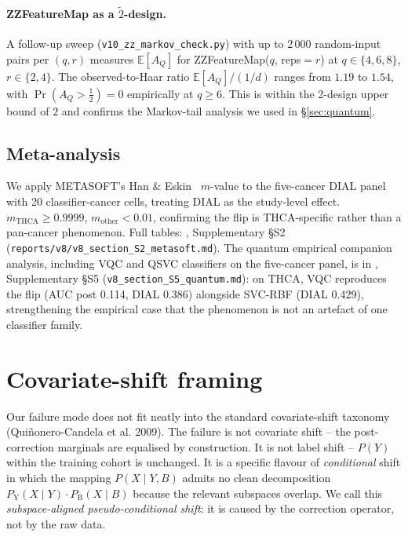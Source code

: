 \documentclass[letterpaper,11pt]{article}
\newcommand{\E}{\mathbb{E}}
\begin{document}
\paragraph{ZZFeatureMap as a $\tilde 2$-design.}
A follow-up sweep (\texttt{v10\_zz\_markov\_check.py}) with up to 2\,000
random-input pairs per $(q,r)$ measures $\E[A_Q]$ for
ZZFeatureMap($q$, reps$=r$) at $q\in\{4,6,8\}$, $r\in\{2,4\}$.  The
observed-to-Haar ratio $\E[A_Q]/(1/d)$ ranges from $1.19$ to $1.54$,
with $\Pr(A_Q>\tfrac12)=0$ empirically at $q\ge 6$. This is within
the 2-design upper bound of $2$ and confirms the Markov-tail analysis
we used in \S\ref{sec:quantum}.

\subsection{Meta-analysis}
We apply METASOFT's Han \& Eskin~\cite{han2011metasoft} $m$-value
to the five-cancer DIAL panel with 20 classifier-cancer cells,
treating DIAL as the study-level effect. $m_\text{THCA}\ge 0.9999$,
$m_\text{other}<0.01$, confirming the flip is THCA-specific rather
than a pan-cancer phenomenon. Full tables:
\cite{thcadash_bioinfo_2026}, Supplementary §S2
(\texttt{reports/v8/v8\_section\_S2\_metasoft.md}). The quantum
empirical companion analysis, including VQC and QSVC classifiers on
the five-cancer panel, is in \cite{thcadash_bioinfo_2026},
Supplementary §S5 (\texttt{v8\_section\_S5\_quantum.md}): on THCA,
VQC reproduces the flip (AUC post 0.114, DIAL 0.386) alongside
SVC-RBF (DIAL 0.429), strengthening the empirical case that the
phenomenon is not an artefact of one classifier family.

\section{Covariate-shift framing}
\label{sec:related-cov}

Our failure mode does not fit neatly into the standard covariate-shift
taxonomy (Qui\~nonero-Candela et al. 2009). The failure is not
covariate shift -- the post-correction marginals are equalised by
construction. It is not label shift -- $P(Y)$ within the training
cohort is unchanged. It is a specific flavour of \emph{conditional}
shift in which the mapping $P(X\mid Y,B)$ admits no clean
decomposition $P_{\mathrm{Y}}(X\mid Y)\cdot P_{\mathrm{B}}(X\mid B)$
because the relevant subspaces overlap. We call this
\emph{subspace-aligned pseudo-conditional shift}: it is caused by the
correction operator, not by the raw data.
\end{document}

